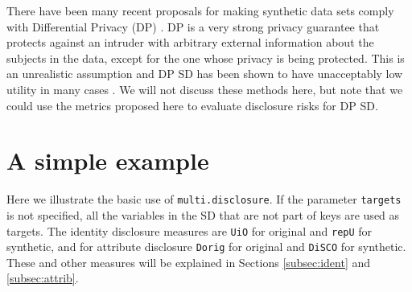 \documentclass[12pt]{article}
\begin{document}
There have been many recent proposals for making synthetic data sets comply with  Differential Privacy (DP) \cite{Dwork2006b}. DP is a very strong privacy guarantee that protects against an intruder with arbitrary external information about the subjects in the data, except for the one whose privacy is being protected. This is an unrealistic assumption and DP SD has been shown to have unacceptably low utility in many cases \cite{bowen_ss, groundhog}. We will not discuss these methods here, but note that we could use the metrics proposed here to evaluate disclosure risks for DP SD. 




\section[A simple example]{A simple example}\label{sec:simpexamp}
Here we illustrate the basic use of \texttt{multi.disclosure}. If the parameter \texttt{targets} is not specified, all the variables in the SD that are not part of keys are used as targets.
The identity disclosure measures are \texttt{UiO} for original and \texttt{repU} for synthetic, and for attribute disclosure \texttt{Dorig} for original and \texttt{DiSCO} for synthetic. These and other measures will be explained in Sections \ref{subsec:ident} and \ref{subsec:attrib}.
\end{document}
